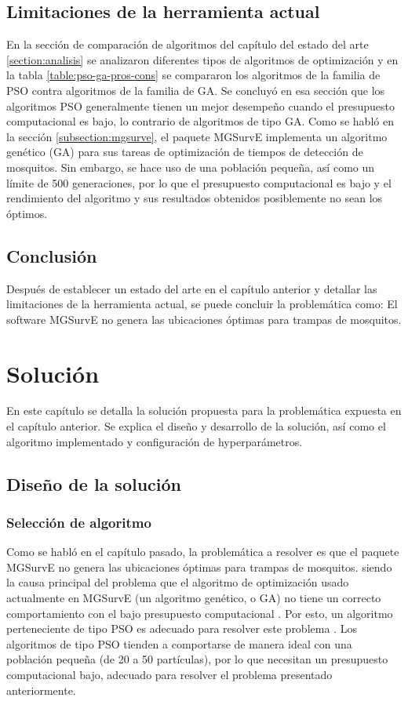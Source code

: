 \documentclass[letterpaper]{report}
\begin{document}
  \section{Limitaciones de la herramienta actual}
    En la sección de comparación de algoritmos del capítulo del
    estado del arte
    \ref{section:analisis} se analizaron diferentes tipos de algoritmos de
    optimización y en la tabla \ref{table:pso-ga-pros-cons} se compararon los
    algoritmos de la familia de PSO contra algoritmos de la familia de GA. Se
    concluyó en esa sección que los algoritmos PSO generalmente tienen un mejor
    desempeño cuando el presupuesto computacional es bajo, lo contrario de
    algoritmos de tipo GA. Como se habló en la sección \ref{subsection:mgsurve},
    el paquete MGSurvE implementa un algoritmo genético (GA) para sus tareas de
    optimización de tiempos de detección de mosquitos. Sin embargo, se hace uso
    de una población pequeña, así como un límite de 500 generaciones, por lo que
    el presupuesto computacional es bajo y el rendimiento del algoritmo y sus
    resultados obtenidos posiblemente no sean los óptimos.

  \section{Conclusión}
    Después de establecer un estado del arte en el capítulo anterior y detallar
    las limitaciones de la herramienta actual, se puede concluir la problemática
    como: El software MGSurvE no genera las ubicaciones óptimas para trampas de
    mosquitos. 

\chapter{Solución}\label{chap:solucion}
  En este capítulo se detalla la solución propuesta para la problemática
  expuesta en el capítulo anterior. Se explica el diseño y desarrollo de la
  solución, así como el algoritmo implementado y configuración de
  hyperparámetros.

  \section{Diseño de la solución}
    \subsection{Selección de algoritmo}
    Como se habló en el capítulo pasado, la problemática a resolver es que el
    paquete MGSurvE no genera las ubicaciones óptimas para trampas de mosquitos.
    siendo la causa principal del
    problema que el algoritmo de optimización usado actualmente en MGSurvE
    (un algoritmo genético, o GA) no tiene un correcto comportamiento con el
    bajo presupuesto computacional \cite{SwarmVsEvol}. Por esto, un algoritmo
    perteneciente de tipo PSO es adecuado para resolver
    este problema \cite{SwarmVsEvol,PSOPopulationSize}. Los algoritmos de tipo
    PSO tienden a comportarse de manera ideal con una población pequeña (de 20
    a 50 partículas), por lo que necesitan un presupuesto computacional bajo,
    adecuado para resolver el problema presentado anteriormente.
\end{document}
